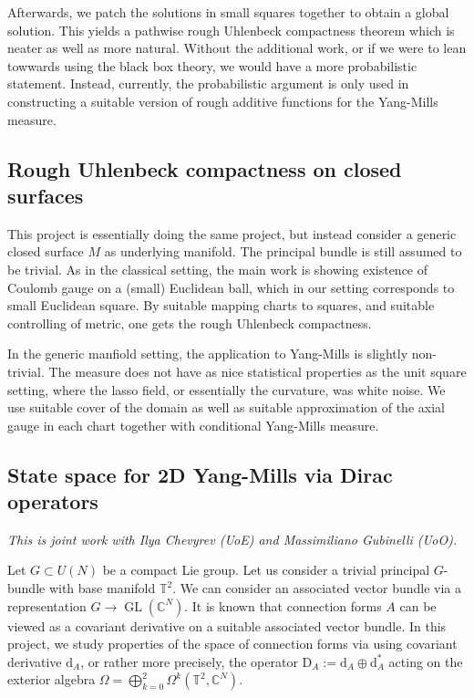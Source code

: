 \documentclass[11pt]{article}
\numberwithin{equation}{section}
\theoremstyle{definition}
\theoremstyle{remark}
\newcommand{\diff}{\mathrm{d}}
\newcommand{\1}{\mathbf 1}
\newcommand{\<}{\langle}
\renewcommand{\>}{\rangle}
\newcommand{\bT}{\mathbb T}
\begin{document}
Afterwards, we patch the solutions in small squares together to obtain a global solution. This yields a pathwise rough Uhlenbeck compactness theorem which is neater as well as more natural. Without the additional work, or if we were to lean towwards using the black box theory, we would have a more probabilistic statement. Instead, currently, the probabilistic argument  is only used in constructing a suitable version of rough additive functions for the Yang-Mills measure. 
%
\subsection{Rough Uhlenbeck compactness on closed surfaces}
This project is essentially doing the same project, but instead consider a generic closed surface $M$ as underlying manifold. The principal bundle is still assumed to be trivial. As in the classical setting, the main work is showing existence of Coulomb gauge on a (small) Euclidean ball, which in our setting corresponds to small Euclidean square. By suitable mapping charts to squares, and suitable controlling of metric, one gets the rough Uhlenbeck compactness. 

In the generic manfiold setting, the application to Yang-Mills is slightly non-trivial. The measure does not have as nice statistical properties as the unit square setting, where the lasso field, or essentially the curvature, was white noise. We use suitable cover of the domain as well as suitable approximation of the axial gauge in each chart together with conditional Yang-Mills measure. 
%
\subsection{State space for 2D Yang-Mills via Dirac operators}
%
\textit{This is joint work with Ilya Chevyrev (UoE) and Massimiliano Gubinelli (UoO).} 

\medskip 

\noindent Let $G\subset U(N)$ be a compact Lie group. Let us consider a trivial principal $G$-bundle with base manifold $\bT^2$. We can consider an associated vector bundle via a representation $G\to \operatorname{GL}(\mathbb C^N)$. It is known that connection forms $A$ can be viewed as a covariant derivative on a suitable associated vector bundle. In this project, we study properties of the space of connection forms via using covariant derivative $\diff_A$, or rather more precisely, the operator  $\mathrm{D}_A:=\diff_A\oplus\diff_A^*$ acting on the exterior algebra $\Omega=\bigoplus_{k=0}^ 2\Omega^k(\bT^2,\mathbb C^N)$. 
\end{document}
